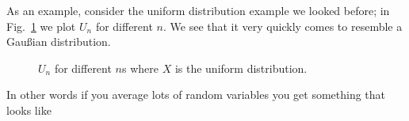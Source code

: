 \documentclass[11pt,a4paper]{scrartcl}
\begin{document}
As an example, consider the uniform distribution example we looked
before; in Fig.~\ref{fig_const} we plot $U_n$ for different $n$. We
see that it very quickly comes to resemble a Gau\ss{}ian distribution.

\begin{figure}[tb]
\begin{center}

\end{center}
\caption{$U_n$ for different $n$s where $X$ is the uniform distribution.\label{fig_const}}
\end{figure}






In other words if you average lots of random variables you get something that looks like 
\end{document}
